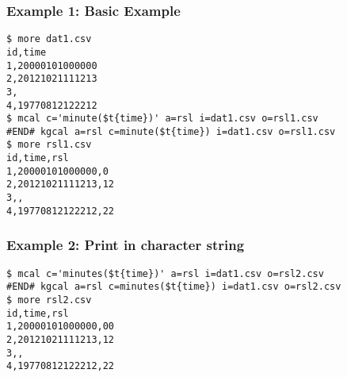 \subsubsection*{Example 1: Basic Example}



\begin{Verbatim}[baselinestretch=0.7,frame=single]
$ more dat1.csv
id,time
1,20000101000000
2,20121021111213
3,
4,19770812122212
$ mcal c='minute($t{time})' a=rsl i=dat1.csv o=rsl1.csv
#END# kgcal a=rsl c=minute($t{time}) i=dat1.csv o=rsl1.csv
$ more rsl1.csv
id,time,rsl
1,20000101000000,0
2,20121021111213,12
3,,
4,19770812122212,22
\end{Verbatim}
\subsubsection*{Example 2: Print in character string}



\begin{Verbatim}[baselinestretch=0.7,frame=single]
$ mcal c='minutes($t{time})' a=rsl i=dat1.csv o=rsl2.csv
#END# kgcal a=rsl c=minutes($t{time}) i=dat1.csv o=rsl2.csv
$ more rsl2.csv
id,time,rsl
1,20000101000000,00
2,20121021111213,12
3,,
4,19770812122212,22
\end{Verbatim}

